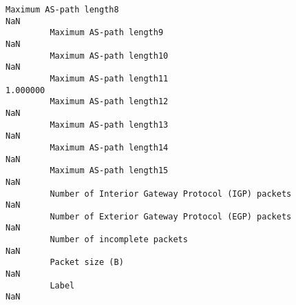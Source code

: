 \documentclass[11pt]{article}
\begin{document}
\begin{Verbatim}[commandchars=\\\{\}]
         Maximum AS-path length8                                                 NaN   
         Maximum AS-path length9                                                 NaN   
         Maximum AS-path length10                                                NaN   
         Maximum AS-path length11                                           1.000000   
         Maximum AS-path length12                                                NaN   
         Maximum AS-path length13                                                NaN   
         Maximum AS-path length14                                                NaN   
         Maximum AS-path length15                                                NaN   
         Number of Interior Gateway Protocol (IGP) packets                       NaN   
         Number of Exterior Gateway Protocol (EGP) packets                       NaN   
         Number of incomplete packets                                            NaN   
         Packet size (B)                                                         NaN   
         Label                                                                   NaN   
         

\end{Verbatim}
\end{document}
